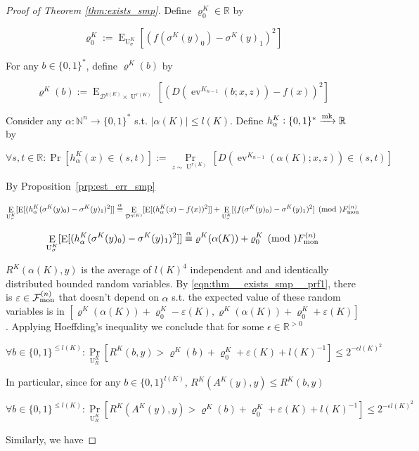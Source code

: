 \documentclass{article}
\numberwithin{equation}{section}
\theoremstyle{definition}
\theoremstyle{plain}
\newcommand{\Bool}{\{0,1\}}
\newcommand{\Words}{{\Bool^*}}
\DeclareMathOperator{\Prb}{Pr}
\DeclareMathOperator{\E}{E}
\DeclareMathOperator{\Ev}{ev}
\DeclareMathOperator{\Un}{U}
\newcommand{\Nats}{\mathbb{N}}
\newcommand{\Reals}{\mathbb{R}}
\newcommand{\Abs}[1]{\lvert #1 \rvert}
\newcommand{\Dist}{\mathcal{D}}
\newcommand{\Fall}{\mathcal{F}}
\newcommand{\FallM}{\Fall_{\textnormal{mon}}^{(n)}}
\newcommand{\Markov}{\xrightarrow{\textnormal{mk}}}
\begin{document}
\begin{proof}[Proof of Theorem \ref{thm:exists_smp}]
Define ${\varrho_0^K \in \Reals}$ by

\[\varrho_0^K:=\E_{\Un_\sigma^K}[(f(\sigma^K(y)_0)-\sigma^K(y)_1)^2]\]

For any ${b \in \Words}$, define ${\varrho^K(b)}$ by

\[\varrho^K(b):=\E_{\Dist^{\eta(K)} \times \Un^{r(K)}}[(D(\Ev^{K_{n-1}}(b;x,z))-f(x))^2]\]

Consider any ${\alpha: \Nats^n \rightarrow \Words}$ s.t. ${\Abs{\alpha(K)} \leq l(K)}$. Define ${h_\alpha^K: \Words \Markov \Reals}$ by

\[\forall s,t \in \Reals: \Pr[h_\alpha^K(x) \in (s,t)]:=\Prb_{z \sim \Un^{r(K)}}[D(\Ev^{K_{n-1}}(\alpha(K);x,z)) \in (s,t)]\]

By Proposition~\ref{prp:est_err_smp}

\[\E_{\Un_\sigma^K}[\E[(h_\alpha^K(\sigma^K(y)_0)-\sigma^K(y)_1)^2]] \overset{\alpha}{\equiv} \E_{\Dist^{\eta(K)}}[\E[(h_\alpha^K(x)-f(x))^2]] + \E_{\Un_\sigma^K}[(f(\sigma^K(y)_0)-\sigma^K(y)_1)^2] \pmod \FallM\]

\begin{equation}
\label{eqn:thm__exists_smp__prf1}
\E_{\Un_\sigma^K}[\E[(h_\alpha^K(\sigma^K(y)_0)-\sigma^K(y)_1)^2]] \overset{\alpha}{\equiv} \varrho^K(\alpha(K)) + \varrho_0^K \pmod \FallM
\end{equation}

${R^K(\alpha(K),y)}$ is the average of ${l(K)^4}$ independent and and identically distributed bounded random variables. By \ref{eqn:thm__exists_smp__prf1}, there is ${\varepsilon \in \FallM}$ that doesn't depend on ${\alpha}$ s.t. the expected value of these random variables is in ${[\varrho^K(\alpha(K)) + \varrho_0^K - \varepsilon(K), \varrho^K(\alpha(K)) + \varrho_0^K + \varepsilon(K)]}$. Applying Hoeffding's inequality we conclude that for some ${\epsilon \in \Reals^{>0}}$

\[\forall b \in \Bool^{\leq l(K)}: \Prb_{\Un_R^K}[R^K(b,y) > \varrho^K(b) + \varrho_0^K  + \varepsilon(K) + l(K)^{-1}] \leq 2^{-\epsilon l(K)^2}\]

In particular, since for any ${b \in \Bool^{l(K)}}$, ${R^K(A^K(y),y) \leq R^K(b,y)}$

\begin{equation}
\label{eqn:thm__exists_smp__prf2}
\forall b \in \Bool^{\leq l(K)}: \Prb_{\Un_R^K}[R^K(A^K(y),y) > \varrho^K(b) + \varrho_0^K + \varepsilon(K) + l(K)^{-1}] \leq 2^{-\epsilon l(K)^2}
\end{equation}

Similarly, we have


\end{proof}
\end{document}
